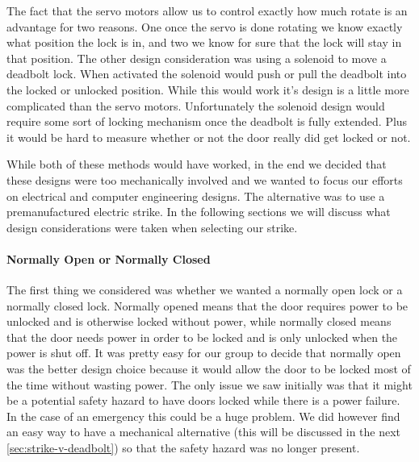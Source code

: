  
The fact that the servo motors allow us to control exactly how much rotate is
an advantage for two reasons. One once the servo is done rotating we know
exactly what position the lock is in, and two we know for sure that the lock
will stay in that position. The other design consideration was using a solenoid
to move a deadbolt lock. When activated the solenoid would push or pull the
deadbolt into the locked or unlocked position. While this would work it{}'s
design is a little more complicated than the servo motors. Unfortunately the
solenoid design would require some sort of locking mechanism once the deadbolt
is fully extended. Plus it would be hard to measure whether or not the door
really did get locked or not.

While both of these methods would have worked, in the end we decided that these
designs were too mechanically involved and we wanted to focus our efforts on
electrical and computer engineering designs. The alternative was to use a
premanufactured electric strike. In the following sections we will discuss what
design considerations were taken when selecting our strike.

\paragraph{Normally Open or Normally Closed}
The first thing we considered was whether we wanted a normally open lock or a
normally closed lock. Normally opened means that the door requires power to be
unlocked and is otherwise locked without power, while normally closed means
that the door needs power in order to be locked and is only unlocked when the
power is shut off. It was pretty easy for our group to decide that normally
open was the better design choice because it would allow the door to be locked
most of the time without wasting power. The only issue we saw initially was
that it might be a potential safety hazard to have doors locked while there is
a power failure. In the case of an emergency this could be a huge problem. We
did however find an easy way to have a mechanical alternative (this will be
discussed in the next \autoref{sec:strike-v-deadbolt}) so that the safety hazard was
no longer present.


